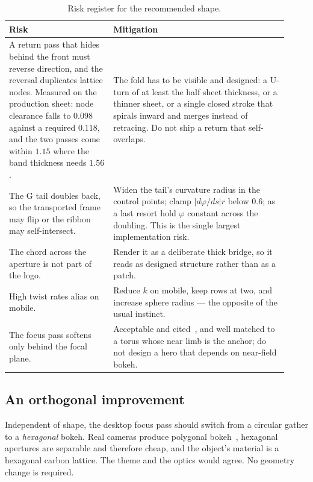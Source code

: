 \documentclass[11pt,a4paper]{article}
\theoremstyle{definition}
\begin{document}
\begin{table}[htbp]
\centering
\small
\begin{tabular}{@{}p{0.34\linewidth}p{0.58\linewidth}@{}}
\toprule
\textbf{Risk} & \textbf{Mitigation} \\
\midrule
A return pass that hides behind the front must reverse direction, and the
reversal duplicates lattice nodes. Measured on the production sheet: node
clearance falls to $0.098$ against a required $0.118$, and the two passes come
within $1.15$ where the band thickness needs $1.56$. &
The fold has to be visible and designed: a U-turn of at least the half sheet
thickness, or a thinner sheet, or a single closed stroke that spirals inward
and merges instead of retracing. Do not ship a return that self-overlaps. \\
The G tail doubles back, so the transported frame may flip or the ribbon may
self-intersect. &
Widen the tail's curvature radius in the control points; clamp
$\lvert d\varphi/ds\rvert r$ below $0.6$; as a last resort hold $\varphi$
constant across the doubling. This is the single largest implementation
risk. \\
The chord across the aperture is not part of the logo. &
Render it as a deliberate thick bridge, so it reads as designed structure
rather than as a patch. \\
High twist rates alias on mobile. &
Reduce $k$ on mobile, keep rows at two, and increase sphere radius --- the
opposite of the usual instinct. \\
The focus pass softens only behind the focal plane. &
Acceptable and cited~\cite{hammon2007}, and well matched to a torus whose near
limb is the anchor; do not design a hero that depends on near-field bokeh. \\
\bottomrule
\end{tabular}
\caption{Risk register for the recommended shape.}
\label{tab:risks}
\end{table}

\subsection{An orthogonal improvement}

Independent of shape, the desktop focus pass should switch from a circular
gather to a \emph{hexagonal} bokeh. Real cameras produce polygonal
bokeh~\cite{mcintosh2012}, hexagonal apertures are separable and therefore
cheap, and the object's material is a hexagonal carbon lattice. The theme and
the optics would agree. No geometry change is required.
\end{document}
